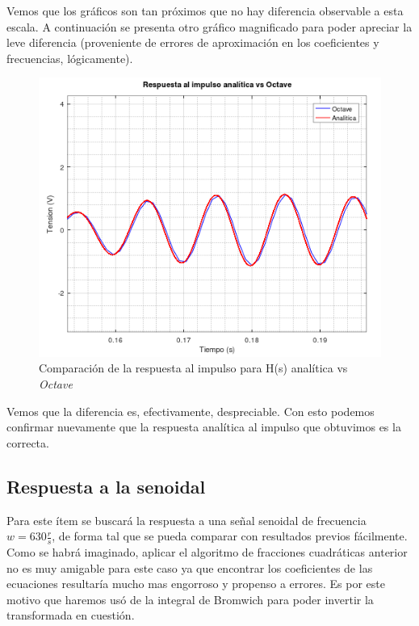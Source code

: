 \documentclass[11pt,a4paper]{report}
\begin{document}
Vemos que los gráficos son tan próximos que no hay diferencia observable a esta escala. A continuación se presenta otro gráfico magnificado para poder apreciar la leve diferencia (proveniente de errores de aproximación en los coeficientes y frecuencias, lógicamente).



\begin{figure}[ht!]
\centering
\includegraphics[scale=1]{rtaImpulsoAnaliticavsOctaveMagnificada.png}
\caption{Comparación de la respuesta al impulso para H(s) analítica vs \textit{Octave}}
\end{figure}

Vemos que la diferencia es, efectivamente, despreciable. Con esto podemos confirmar nuevamente que la respuesta analítica al impulso que obtuvimos es la correcta.

\subsection*{Respuesta a la senoidal}

Para este ítem se buscará la respuesta a una señal senoidal de frecuencia $w = 630 \frac{r}{s}$, de forma tal que se pueda comparar con resultados previos fácilmente.
Como se habrá imaginado, aplicar el algoritmo de fracciones cuadráticas anterior no es muy amigable para este caso ya que encontrar los coeficientes de las ecuaciones resultaría mucho mas engorroso y propenso a errores. Es por este motivo que haremos usó de la integral de Bromwich para poder invertir la transformada en cuestión.
\end{document}
